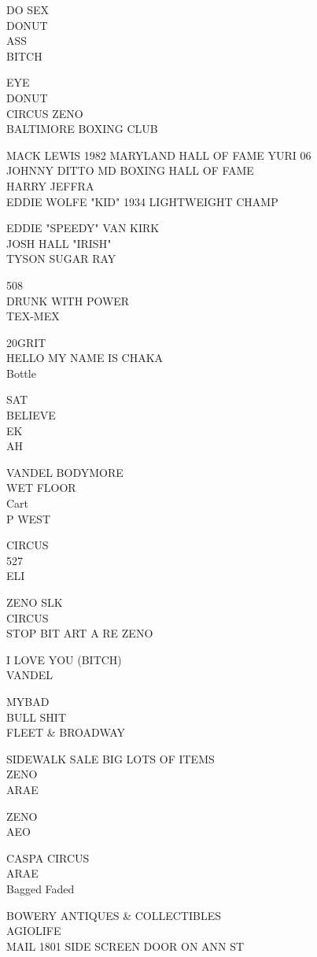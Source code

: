 \documentclass[10pt,letterpaper]{article}
\begin{document}
DO SEX\\
DONUT\\
ASS\\
BITCH

EYE\\
DONUT\\
CIRCUS ZENO\\
BALTIMORE BOXING CLUB

MACK LEWIS 1982 MARYLAND HALL OF FAME YURI 06\\
JOHNNY DITTO MD BOXING HALL OF FAME\\
HARRY JEFFRA\\
EDDIE WOLFE "KID" 1934 LIGHTWEIGHT CHAMP

EDDIE "SPEEDY" VAN KIRK\\
JOSH HALL "IRISH"\\
TYSON SUGAR RAY

508\\
DRUNK WITH POWER\\
TEX{-}MEX

20GRIT\\
HELLO MY NAME IS CHAKA\\
Bottle

SAT\\
BELIEVE\\
EK\\
AH

VANDEL BODYMORE\\
WET FLOOR\\
Cart\\
P WEST

CIRCUS\\
527\\
ELI

ZENO SLK\\
CIRCUS\\
STOP BIT ART A RE ZENO

I LOVE YOU (BITCH)\\
VANDEL

MYBAD\\
BULL SHIT\\
FLEET \& BROADWAY

SIDEWALK SALE BIG LOTS OF ITEMS\\
ZENO\\
ARAE

ZENO\\
AEO

CASPA CIRCUS\\
ARAE\\
Bagged Faded

BOWERY ANTIQUES \& COLLECTIBLES\\
AGIOLIFE\\
MAIL 1801 SIDE SCREEN DOOR ON ANN ST
\end{document}
